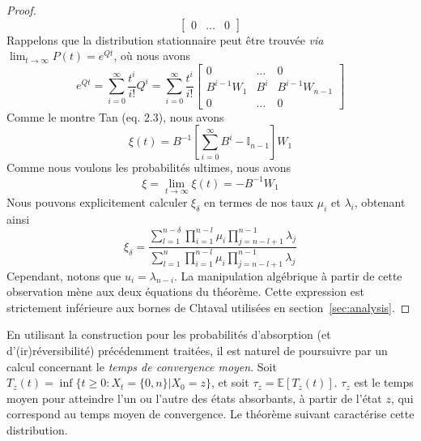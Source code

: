 \documentclass[a4,twocolumn,10pt]{article}
\newcommand\ddfrac[2]{\frac{\displaystyle #1}{\displaystyle #2}}
\theoremstyle{definition}
\begin{document}
\begin{appendices}
\begin{proof}
\[\begin{bmatrix}
        0 & \dots & 0
    \end{bmatrix}
\]
Rappelons que la distribution stationnaire peut être trouvée \emph{via} $\lim_{t \rightarrow \infty} P(t) = e^{Qt}$, où nous avons
\[
    e^{Qt} = \sum_{i = 0}^{\infty} \frac{t^i}{i!} Q^i = \sum_{i = 0}^{\infty} \frac{t^i}{i!}
    \begin{bmatrix}
        0 & \dots & 0\\
        B^{i-1}W_1 & B^i & B^{i-1}W_{n-1}\\
        0 & \dots & 0
    \end{bmatrix}
\]
Comme le montre Tan (eq. 2.3), nous avons
\[
    \xi(t) = B^{-1}\left[\sum_{i = 0}^{\infty} B^i  - \mathbb{I}_{n-1} \right] W_1
\]
Comme nous voulons les probabilités ultimes, nous avons 
\[
    \xi = \lim_{t \rightarrow \infty} \xi(t) = -B^{-1}W_1
\]
Nous pouvons explicitement calculer $\xi_\delta$ en termes de nos taux $\mu_i$ et $\lambda_i$, obtenant ainsi
\[
    \xi_\delta = \ddfrac{\sum_{l = 1}^{n-\delta}\prod_{i = 1}^{n-l}\mu_i \prod_{j = n-l+1}^{n-1}\lambda_j}{\sum_{l = 1}^{n}\prod_{i = 1}^{n-l}\mu_i \prod_{j = n-l+1}^{n-1}\lambda_j}
\]
Cependant, notons que $u_{i} = \lambda_{n-i}$. La manipulation algébrique à partir de cette observation mène aux deux équations du théorème. Cette expression est strictement inférieure aux bornes de Chtaval utilisées en section~\ref{sec:analysis}.
\end{proof}

En utilisant la construction pour les probabilités d'absorption (et d'(ir)réversibilité) précédemment traitées, il est naturel de poursuivre par un calcul concernant le \emph{temps de convergence moyen}.
Soit $T_{z}(t) = \inf \{t \geq 0 : X_t = \{0, n\} | X_0 = z\}$, et soit $\tau_z = \mathbb{E}[T_{z}(t)]$. $\tau_z$ est le temps moyen pour atteindre l'un ou l'autre des états absorbants, à partir de l'état $z$, qui correspond au temps moyen de convergence. Le théorème suivant caractérise cette distribution.


\end{appendices}
\end{document}
